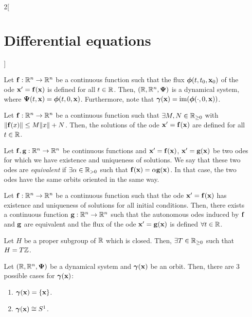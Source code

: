 \documentclass[../../../main.tex]{subfiles}
\begin{document}
\begin{multicols}{2}[\section{Differential equations}]
\begin{definition}
    \end{definition}
    \begin{lemma}
        Let $\boldsymbol{\mathrm{f}}:\mathbb{R}^n\rightarrow\mathbb{R}^n$ be a continuous function such that the flux $\boldsymbol{\mathrm{\phi}}(t,t_0,\boldsymbol{\mathrm{x}}_0)$ of the ode $\boldsymbol{\mathrm{x}}' =\boldsymbol{\mathrm{f}}(\boldsymbol{\mathrm{x}})$ is defined for all $t\in\mathbb{R}$. Then, $(\mathbb{R},\mathbb{R}^n,\boldsymbol{\mathrm{\Psi}})$ is a dynamical system, where $\boldsymbol{\mathrm{\Psi}}(t,\boldsymbol{\mathrm{x}})=\boldsymbol{\mathrm{\phi}}(t,0,\boldsymbol{\mathrm{x}})$. Furthermore, note that $\boldsymbol{\mathrm{\gamma}}(\boldsymbol{\mathrm{x}})=\operatorname{im}(\boldsymbol{\mathrm{\phi}}(\cdot,0,\boldsymbol{\mathrm{x}}))$.
    \end{lemma}
    \begin{lemma}
        Let $\boldsymbol{\mathrm{f}}:\mathbb{R}^n\rightarrow\mathbb{R}^n$ be a continuous function such that $\exists M,N\in\mathbb{R}_{\geq 0}$ with $\|\boldsymbol{\mathrm{f}}(x)\|\leq M\|x\|+N$. Then, the solutions of the ode $\boldsymbol{\mathrm{x}}' =\boldsymbol{\mathrm{f}}(\boldsymbol{\mathrm{x}})$ are defined for all $t\in\mathbb{R}$.
    \end{lemma}
    \begin{definition}
        Let $\boldsymbol{\mathrm{f}},\boldsymbol{\mathrm{g}}:\mathbb{R}^n\rightarrow\mathbb{R}^n$ be continuous functions and $\boldsymbol{\mathrm{x}}' =\boldsymbol{\mathrm{f}}(\boldsymbol{\mathrm{x}})$, $\boldsymbol{\mathrm{x}}' =\boldsymbol{\mathrm{g}}(\boldsymbol{\mathrm{x}})$ be two odes for which we have existence and uniqueness of solutions. We say that these two odes are \textit{equivalent} if $\exists \alpha\in\mathbb{R}_{>0}$ such that $\boldsymbol{\mathrm{f}}(\boldsymbol{\mathrm{x}})=\alpha \boldsymbol{\mathrm{g}}(\boldsymbol{\mathrm{x}})$. In that case, the two odes have the same orbits oriented in the same way.
    \end{definition}
    \begin{corollary}
        Let $\boldsymbol{\mathrm{f}}:\mathbb{R}^n\rightarrow\mathbb{R}^n$ be a continuous function such that the ode $\boldsymbol{\mathrm{x}}' =\boldsymbol{\mathrm{f}}(\boldsymbol{\mathrm{x}})$ has existence and uniqueness of solutions for all initial conditions. Then, there exists a continuous function $\boldsymbol{\mathrm{g}}:\mathbb{R}^n\rightarrow\mathbb{R}^n$ such that the autonomous odes induced by $\boldsymbol{\mathrm{f}}$ and $\boldsymbol{\mathrm{g}}$ are equivalent and the flux of the ode $\boldsymbol{\mathrm{x}}' =\boldsymbol{\mathrm{g}}(\boldsymbol{\mathrm{x}})$ is defined $\forall t\in\mathbb{R}$.
    \end{corollary}
    \begin{lemma}
        Let $H$ be a proper subgroup of $\mathbb{R}$ which is closed. Then, $\exists T\in\mathbb{R}_{\geq 0}$ such that $H=T\mathbb{Z}$.
    \end{lemma}
    \begin{prop}
        Let $(\mathbb{R},\mathbb{R}^n,\boldsymbol{\mathrm{\Psi}})$ be a dynamical system and $\boldsymbol{\mathrm{\gamma}}(\boldsymbol{\mathrm{x}})$ be an orbit. Then, there are 3 possible cases for $\boldsymbol{\mathrm{\gamma}}(\boldsymbol{\mathrm{x}})$:
        \begin{enumerate}
            \item $\boldsymbol{\mathrm{\gamma}}(\boldsymbol{\mathrm{x}})=\{\boldsymbol{\mathrm{x}}\}$.
            \item $\boldsymbol{\mathrm{\gamma}}(\boldsymbol{\mathrm{x}})\cong S^1$.

\end{enumerate}
\end{prop}
\end{multicols}
\end{document}
